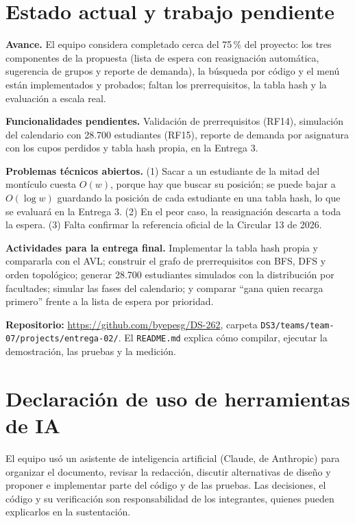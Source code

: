 \documentclass[conference]{IEEEtran}
\begin{document}

\section{Estado actual y trabajo pendiente}

\textbf{Avance.} El equipo considera completado cerca del 75\,\% del proyecto: los tres componentes de la propuesta (lista de espera con reasignación automática, sugerencia de grupos y reporte de demanda), la búsqueda por código y el menú están implementados y probados; faltan los prerrequisitos, la tabla hash y la evaluación a escala real.

\textbf{Funcionalidades pendientes.} Validación de prerrequisitos (RF14), simulación del calendario con 28.700 estudiantes (RF15), reporte de demanda por asignatura con los cupos perdidos y tabla hash propia, en la Entrega 3.

\textbf{Problemas técnicos abiertos.} (1) Sacar a un estudiante de la mitad del montículo cuesta $O(w)$, porque hay que buscar su posición; se puede bajar a $O(\log w)$ guardando la posición de cada estudiante en una tabla hash, lo que se evaluará en la Entrega 3. (2) En el peor caso, la reasignación descarta a toda la espera. (3) Falta confirmar la referencia oficial de la Circular 13 de 2026.

\textbf{Actividades para la entrega final.} Implementar la tabla hash propia y compararla con el AVL; construir el grafo de prerrequisitos con BFS, DFS y orden topológico; generar 28.700 estudiantes simulados con la distribución por facultades; simular las fases del calendario; y comparar ``gana quien recarga primero'' frente a la lista de espera por prioridad.

\textbf{Repositorio:} \url{https://github.com/byepesg/DS-262}, carpeta \texttt{DS3/teams/team-07/projects/entrega-02/}. El \texttt{README.md} explica cómo compilar, ejecutar la demostración, las pruebas y la medición.


\section*{Declaración de uso de herramientas de IA}
El equipo usó un asistente de inteligencia artificial (Claude, de Anthropic) para organizar el documento, revisar la redacción, discutir alternativas de diseño y proponer e implementar parte del código y de las pruebas. Las decisiones, el código y su verificación son responsabilidad de los integrantes, quienes pueden explicarlos en la sustentación.
\end{document}
